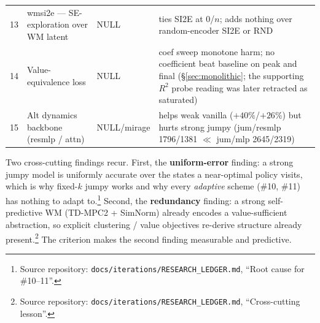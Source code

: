 \documentclass{article}
\begin{document}
\begin{table}[t]
\begin{tabular}{@{}r p{3.6cm} l p{6.6cm}@{}}
13 & wmsi2e --- SE-exploration over WM latent & NULL & ties SI2E at 0/$n$; adds nothing over random-encoder SI2E or RND \\
14 & Value-equivalence loss & NULL & coef sweep monotone harm; no coefficient beat baseline on peak and final (\S\ref{sec:monolithic}; the supporting $R^2$ probe reading was later retracted as saturated) \\
15 & Alt dynamics backbone (resmlp / attn) & NULL/mirage & helps weak vanilla ($+40\%$/$+26\%$) but hurts strong jumpy (jum/resmlp 1796/1381 $\ll$ jum/mlp 2645/2319) \\
\bottomrule
\end{tabular}
\end{table}

Two cross-cutting findings recur. First, the \textbf{uniform-error} finding: a strong jumpy model is uniformly accurate over the states a near-optimal policy visits, which is why fixed-$k$ jumpy works and why every \emph{adaptive} scheme (\#10, \#11) has nothing to adapt to.\footnote{Source repository: \texttt{docs/iterations/RESEARCH\_LEDGER.md}, ``Root cause for \#10--11''.} Second, the \textbf{redundancy} finding: a strong self-predictive WM (TD-MPC2 + SimNorm) already encodes a value-sufficient abstraction, so explicit clustering / value objectives re-derive structure already present.\footnote{Source repository: \texttt{docs/iterations/RESEARCH\_LEDGER.md}, ``Cross-cutting lesson''.} The criterion makes the second finding measurable and predictive.
\end{document}
